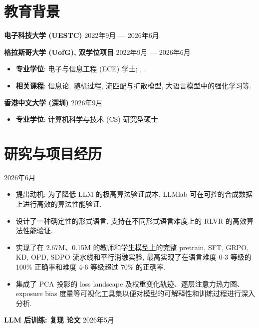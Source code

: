 \section{教育背景}

\textbf{电子科技大学 (UESTC)} \hfill 2022年9月 --- 2026年6月

\textbf{格拉斯哥大学 (UofG), 双学位项目} \hfill 2022年9月 --- 2026年6月

\begin{itemize}
    \item \textbf{专业学位}: 电子与信息工程 (ECE) 学士; , .
    \item \textbf{相关课程}: 信息论, 随机过程, 流匹配与扩散模型, 大语言模型中的强化学习等.
\end{itemize}

\textbf{香港中文大学 (深圳)} \hfill 2026年9月

\begin{itemize}
    \item \textbf{专业学位}: 计算机科学与技术 (CS) 研究型硕士
\end{itemize}


\section{研究与项目经历}

 \hfill 2026年6月

\begin{itemize}
    \item 提出动机: 为了降低 LLM 的极高算法验证成本, LLMlab 可在可控的合成数据上进行高效的算法性能验证.
    \item 设计了一种确定性的形式语言, 支持在不同形式语言难度上的 RLVR 的高效算法性能验证.
    \item 实现了在 2.67M、0.15M 的教师和学生模型上的完整 pretrain, SFT, GRPO, KD, OPD, SDPO 流水线和平行消融实验, 最高实现了在语言难度 0-3 等级的 100\% 正确率和难度 4-6 等级超过 70\% 的正确率.
    \item 集成了 PCA 投影的 loss landscape 及权重变化轨迹、逐层注意力热力图、exposure bias 度量等可视化工具集以便对模型的可解释性和训练过程进行深入分析.
\end{itemize}

\textbf{LLM 后训练: 复现  论文} \hfill 2026年5月


